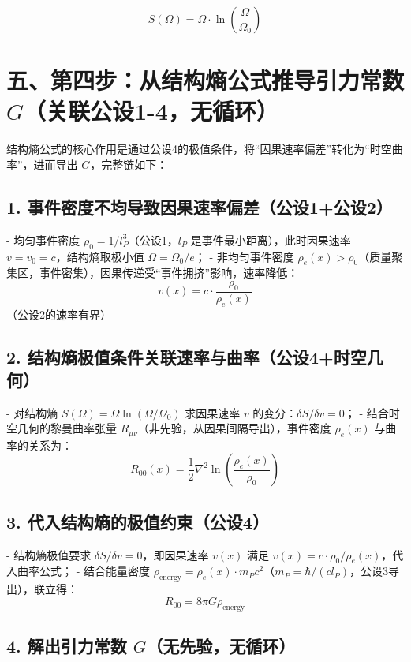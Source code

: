 \documentclass{article}
\begin{document}
\[
\boxed{S(\Omega) = \Omega \cdot \ln\left(\frac{\Omega}{\Omega_0}\right)}
\]

\section*{五、第四步：从结构熵公式推导引力常数 \( G \)（关联公设1-4，无循环）}

结构熵公式的核心作用是通过公设4的极值条件，将“因果速率偏差”转化为“时空曲率”，进而导出 \( G \)，完整链如下：

\subsection*{1. 事件密度不均导致因果速率偏差（公设1+公设2）}

- 均匀事件密度 \( \rho_0 = 1/l_P^3 \)（公设1，\( l_P \) 是事件最小距离），此时因果速率 \( v = v_0 = c \)，结构熵取极小值 \( \Omega = \Omega_0 / e \)；
- 非均匀事件密度 \( \rho_e(x) > \rho_0 \)（质量聚集区，事件密集），因果传递受“事件拥挤”影响，速率降低：
\[
v(x) = c \cdot \frac{\rho_0}{\rho_e(x)}
\]
（公设2的速率有界）

\subsection*{2. 结构熵极值条件关联速率与曲率（公设4+时空几何）}

- 对结构熵 \( S(\Omega) = \Omega \ln(\Omega/\Omega_0) \) 求因果速率 \( v \) 的变分：\( \delta S/\delta v = 0 \)；
- 结合时空几何的黎曼曲率张量 \( R_{\mu\nu} \)（非先验，从因果间隔导出），事件密度 \( \rho_e(x) \) 与曲率的关系为：
\[
R_{00}(x) = \frac{1}{2} \nabla^2 \ln\left(\frac{\rho_e(x)}{\rho_0}\right)
\]

\subsection*{3. 代入结构熵的极值约束（公设4）}

- 结构熵极值要求 \( \delta S/\delta v = 0 \)，即因果速率 \( v(x) \) 满足 \( v(x) = c \cdot \rho_0 / \rho_e(x) \)，代入曲率公式；
- 结合能量密度 \( \rho_{\text{energy}} = \rho_e(x) \cdot m_P c^2 \)（\( m_P = \hbar/(c l_P) \)，公设3导出），联立得：
\[
R_{00} = 8\pi G \rho_{\text{energy}}
\]

\subsection*{4. 解出引力常数 \( G \)（无先验，无循环）}
\end{document}
